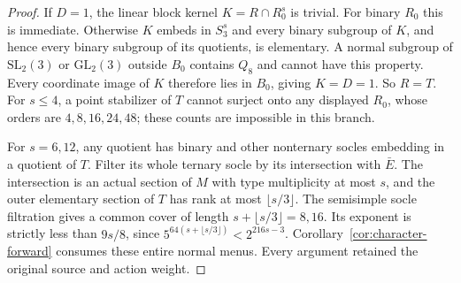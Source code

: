 \begin{proof}
If $D=1$, the linear block kernel $K=R\cap R_0^s$ is trivial.
For binary $R_0$ this is immediate. Otherwise $K$ embeds in
$S_3^s$ and every binary subgroup of $K$, and hence every binary
subgroup of its quotients, is elementary. A normal subgroup of
$\mathrm{SL}_2(3)$ or $\mathrm{GL}_2(3)$ outside $B_0$ contains
$Q_8$ and cannot have this property. Every coordinate image of
$K$ therefore lies in $B_0$, giving $K=D=1$. So $R=T$.
For $s\leq4$, a point stabilizer of $T$ cannot surject onto any
displayed $R_0$, whose orders are $4,8,16,24,48$; these counts
are impossible in this branch.

For $s=6,12$, any quotient has binary and other nonternary socles
embedding in a quotient of $T$. Filter its whole ternary socle by
its intersection with $\bar E$. The intersection is an actual
section of $M$ with type multiplicity at most $s$, and the outer
elementary section of $T$ has rank at most $\lfloor s/3\rfloor$.
The semisimple socle filtration gives a common cover of length
$s+\lfloor s/3\rfloor=8,16$. Its exponent is strictly less
than $9s/8$, since $5^{64(s+\lfloor s/3\rfloor)}<2^{216s-3}$.
Corollary~\ref{cor:character-forward} consumes these entire normal
menus. Every argument retained the original source and action weight.
\end{proof}

